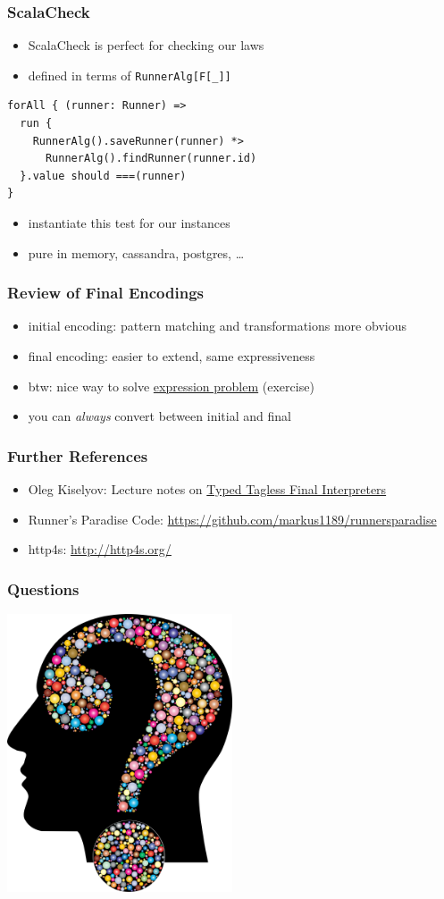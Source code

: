 \documentclass{beamer}
\begin{document}
\begin{frame}[fragile]
  \frametitle{ScalaCheck}
  \begin{itemize}
  \item ScalaCheck is perfect for checking our laws
  \item defined in terms of \texttt{RunnerAlg[F[\_]]}
  \end{itemize}

\begin{verbatim}
forAll { (runner: Runner) =>
  run {
    RunnerAlg().saveRunner(runner) *>
      RunnerAlg().findRunner(runner.id)
  }.value should ===(runner)
}
\end{verbatim}
  \begin{itemize}
  \item instantiate this test for our instances
  \item pure in memory, cassandra, postgres, \dots{}
  \end{itemize}
\end{frame}

\begin{frame}
  \frametitle{Review of Final Encodings}
  \begin{itemize}
  \item initial encoding: pattern matching and transformations more obvious
  \item final encoding: easier to extend, same expressiveness
  \item btw: nice way to solve \href{https://stackoverflow.com/questions/3596366/what-is-the-expression-problem\#3776140}{expression problem} (exercise)
  \item you can \textit{always} convert between initial and final
  \end{itemize}
\end{frame}

\begin{frame}
  \frametitle{Further References}
  \begin{itemize}
  \item Oleg Kiselyov: Lecture notes on
    \href{http://okmij.org/ftp/tagless-final/course/lecture.pdf}{Typed
      Tagless Final Interpreters}
  \item Runner's Paradise Code:
    \url{https://github.com/markus1189/runnersparadise}
  \item http4s: \url{http://http4s.org/}
  \end{itemize}
\end{frame}

\begin{frame}
  \frametitle{Questions}
  \begin{center}
    \includegraphics[width=0.5\textwidth]{../pics/questions.png}
  \end{center}
\end{frame}
\end{document}
